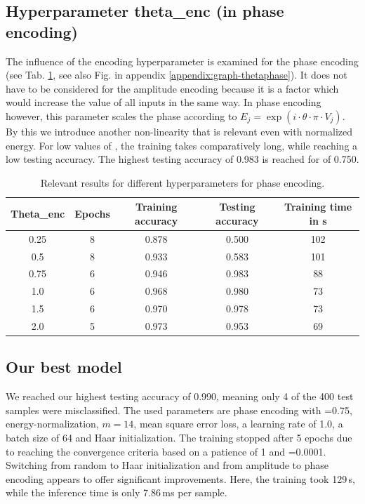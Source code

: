\subsection{Hyperparameter theta\_enc (in phase encoding)}
\label{sec:AmplitudeEncoding}
The influence of the encoding hyperparameter  is examined for the phase encoding (see Tab. \ref{tab:phase_enc}, see also Fig. in appendix \ref{appendix:graph-thetaphase}).
It does not have to be considered for the amplitude encoding because it is a factor which would increase the value of all inputs in the same way. In phase encoding however, this parameter scales the phase according to $E_j=\exp{(i \cdot \theta \cdot \pi \cdot V_j)}$.
By this we introduce another non-linearity that is relevant even with normalized energy.
For low values of , the training takes comparatively long, while reaching a low testing accuracy.
The highest testing accuracy of 0.983 is reached for  of 0.750.
\begin{table}[H]
    \centering
    \caption{Relevant results for different hyperparameters  for phase encoding.}
    \begin{tabular}{|c|c|c|c|c|}
    \hline
    Theta\_enc & Epochs & Training accuracy & Testing accuracy & Training time in s\\
    \hline
        0.25  &  8  &  0.878 & 0.500 & 102\\
        0.5 & 8 & 0.933 & 0.583 & 101\\
        0.75 & 6 & 0.946 & 0.983 & 88\\
        1.0 & 6&  0.968 & 0.980 & 73\\
        1.5 & 6&  0.970 & 0.978 & 73\\
        2.0  &5 & 0.973 & 0.953 & 69\\
    \hline
    \end{tabular}
    \label{tab:phase_enc}
\end{table}

\subsection{Our best model}
We reached our highest testing accuracy of 0.990, meaning only 4 of the 400 test samples were misclassified. 
The used parameters are phase encoding with =0.75, energy-normalization, $m=14$, mean square error loss, a learning rate of 1.0, a batch size of 64 and Haar initialization. 
The training stopped after 5 epochs due to reaching the convergence criteria based on a patience of 1 and =0.0001.
Switching from random to Haar initialization and from amplitude to phase encoding appears to offer significant improvements.
Here, the training took 129\,s, while the inference time is only 7.86\,ms per sample.


